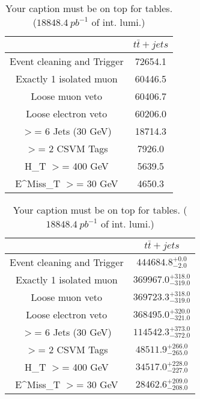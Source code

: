 \documentclass{article}
\begin{document}
\begin{table}
\caption{Your caption must be on top for tables. ($18848.4~pb^{-1}$ of int. lumi.)}
\label{tab:}
\centering
\begin{tabular}{|c|c|}
\toprule
&$t\bar{t}+jets$	\\

\midrule
Event cleaning and Trigger&	72654.1	\\

Exactly 1 isolated muon&	60446.5	\\

Loose muon veto&	60406.7	\\

Loose electron veto&	60206.0	\\

$>$= 6 Jets (30 GeV)&	18714.3	\\

$>$= 2 CSVM Tags&	7926.0	\\

H_{T} $>$=  400 GeV&	5639.5	\\

E^{Miss}_{T} $>$=  30 GeV&	4650.3	\\

\bottomrule
\end{tabular}
\end{table}
\begin{table}
\caption{Your caption must be on top for tables. ($18848.4~pb^{-1}$ of int. lumi.)}
\label{tab:}
\centering
\begin{tabular}{|c|c|}
\toprule
&$t\bar{t}+jets$	\\

\midrule
Event cleaning and Trigger&	$444684.8^{+0.0}_{-2.0}$	\\

Exactly 1 isolated muon&	$369967.0^{+318.0}_{-319.0}$	\\

Loose muon veto&	$369723.3^{+318.0}_{-319.0}$	\\

Loose electron veto&	$368495.0^{+320.0}_{-321.0}$	\\

$>$= 6 Jets (30 GeV)&	$114542.3^{+373.0}_{-372.0}$	\\

$>$= 2 CSVM Tags&	$48511.9^{+266.0}_{-265.0}$	\\

H_{T} $>$=  400 GeV&	$34517.0^{+228.0}_{-227.0}$	\\

E^{Miss}_{T} $>$=  30 GeV&	$28462.6^{+209.0}_{-208.0}$	\\

\bottomrule
\end{tabular}
\end{table}
\end{document}
